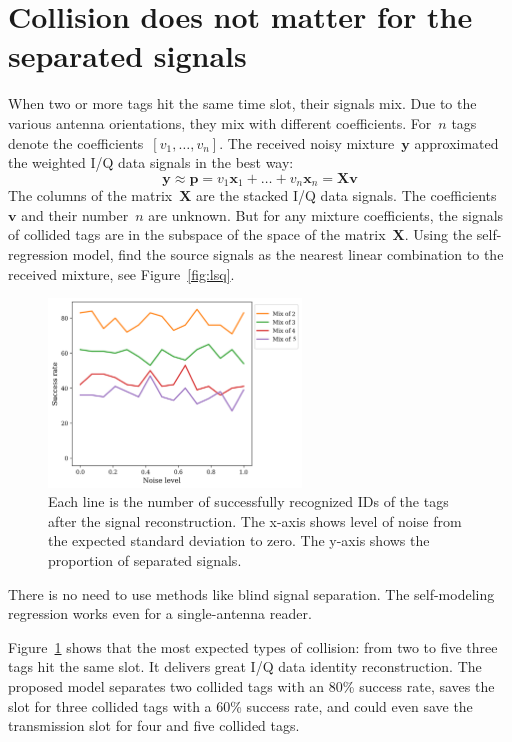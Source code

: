 \documentclass[12pt]{article}
\newcommand{\bx}{\mathbf{x}}
\begin{document}
\section{Collision does not matter for the separated signals}
When two or more tags hit the same time slot, their signals mix. Due to the various antenna orientations, they mix with different coefficients.  For~$n$ tags denote the coefficients~$[v_1, \dots, v_n]$. The received noisy mixture~$\mathbf{y}$ approximated the weighted I/Q data signals in the best way:
\[
\mathbf{y} \approx \mathbf{p} = v_1 \bx_1 + \dots + v_n \bx_n = \mathbf{X}\mathbf{v}
\] 
The columns of the matrix~$\mathbf{X}$ are the stacked I/Q data signals. 
The coefficients~$\mathbf{v}$ and their number~$n$ are unknown. But for any mixture coefficients, the signals of collided tags are in the subspace of the space of the matrix~$\mathbf{X}$. Using the self-regression model, find the source signals as the nearest linear combination to the received mixture, see Figure~\ref{fig:lsq}.

\begin{figure}[!htp]
\centering
\includegraphics[width=0.6\textwidth]{fig_mix_one.png}
\caption{Each line is the number of successfully recognized IDs of the tags after the signal reconstruction. The x-axis shows level of noise from the expected standard deviation to zero. The y-axis shows the proportion of separated signals.}
\label{fig:separation}
\end{figure}
There is no need to use methods like blind signal separation. The self-modeling regression works even for a single-antenna reader. 

Figure~\ref{fig:separation} shows that the most expected types of collision: from two to five three tags hit the same slot. It delivers great I/Q data identity reconstruction. The proposed model separates two collided tags with an 80\% success rate, saves the slot for three collided tags with a 60\% success rate, and could even save the transmission slot for four and five collided tags.
\end{document}
